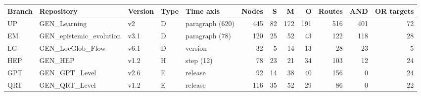\begin{tabular}{@{}lllllrrrrrrr@{}}\toprule
Branch & Repository & Version & Type & Time axis & Nodes & S & M & O & Routes & AND & OR targets \\\midrule
UP & GEN\_Learning & v2 & D & paragraph (620) & 445 & 82 & 172 & 191 & 516 & 401 & 72 \\
EM & GEN\_epistemic\_evolution & v3.1 & D & paragraph (78) & 120 & 25 & 52 & 43 & 122 & 118 & 28 \\
LG & GEN\_LocGlob\_Flow & v6.1 & D & version & 32 & 5 & 14 & 13 & 28 & 23 & 5 \\
HEP & GEN\_HEP & v1.2 & H & step (12) & 78 & 23 & 21 & 34 & 103 & 12 & 24 \\
GPT & GEN\_GPT\_Level & v2.6 & E & release & 92 & 14 & 38 & 40 & 156 & 0 & 24 \\
QRT & GEN\_QRT\_Level & v1.2 & E & release & 116 & 35 & 52 & 29 & 86 & 0 & 22 \\
\bottomrule\end{tabular}
